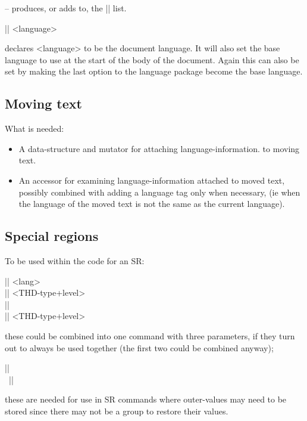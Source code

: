\documentclass{ltxguide}
\begin{document}
-- produces, or adds to, the |\usedlanguages| list.



\begin{decl}
|\SetDocumentLanguage| <language>
\end{decl}

declares <language> to be the document language. It will also set the
base language to use at the start of the body of the document.  Again
this can also be set by making the last option to the language package
become the base language.


\subsection{Moving text}

What is needed:
\begin{itemize}
\item A data-structure and mutator for attaching language-information.
  to moving text.
\item An accessor for examining language-information attached to moved
  text, possibly combined with adding a language tag only when
  necessary, (ie when the language of the moved text is not the same
  as the current language).
\end{itemize}



 
\subsection{Special regions}

To be used within the code for an SR:

\begin{decl}
|\SetSRStartLanguage| <lang>       \\
|\SetSRInitLevel| <THD-type+level> \\
|\ExecuteSRStarttag|               \\
|\SetSRInnerLevel| <THD-type+level> 
\end{decl}

these could be combined into one command with three parameters, if they
turn out to always be used together (the first two could be combined
anyway);

\begin{decl}
|\SRbegin| \\\
|\SRend|
\end{decl}

these are needed for use in SR commands where outer-values may need to
be stored since there may not be a group to restore their values.
\end{document}
